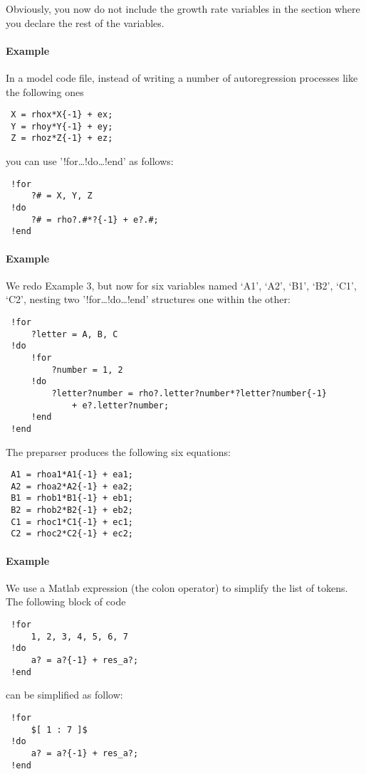  Obviously, you now do not include the growth rate variables in the
 section where you declare the rest of the variables.
 
 \paragraph{Example}
 
 In a model code file, instead of writing a number of autoregression
 processes like the following ones
 
 \begin{verbatim}
 X = rhox*X{-1} + ex;
 Y = rhoy*Y{-1} + ey;
 Z = rhoz*Z{-1} + ez;
 \end{verbatim}
 
 you can use '!for\ldots{}!do\ldots{}!end' as follows:
 
 \begin{verbatim}
 !for
     ?# = X, Y, Z
 !do
     ?# = rho?.#*?{-1} + e?.#;
 !end
 \end{verbatim}
 
 \paragraph{Example}
 
 We redo Example 3, but now for six variables named `A1', `A2', `B1',
 `B2', `C1', `C2', nesting two '!for\ldots{}!do\ldots{}!end' structures
 one within the other:
 
 \begin{verbatim}
 !for
     ?letter = A, B, C
 !do
     !for
         ?number = 1, 2
     !do
         ?letter?number = rho?.letter?number*?letter?number{-1}
             + e?.letter?number;
     !end
 !end
 \end{verbatim}
 
 The preparser produces the following six equations:
 
 \begin{verbatim}
 A1 = rhoa1*A1{-1} + ea1;
 A2 = rhoa2*A2{-1} + ea2;
 B1 = rhob1*B1{-1} + eb1;
 B2 = rhob2*B2{-1} + eb2;
 C1 = rhoc1*C1{-1} + ec1;
 C2 = rhoc2*C2{-1} + ec2;
 \end{verbatim}
 
 \paragraph{Example}
 
 We use a Matlab expression (the colon operator) to simplify the list of
 tokens. The following block of code
 
 \begin{verbatim}
 !for
     1, 2, 3, 4, 5, 6, 7
 !do
     a? = a?{-1} + res_a?;
 !end
 \end{verbatim}
 
 can be simplified as follow:
 
 \begin{verbatim}
 !for
     $[ 1 : 7 ]$
 !do
     a? = a?{-1} + res_a?;
 !end
 \end{verbatim}


